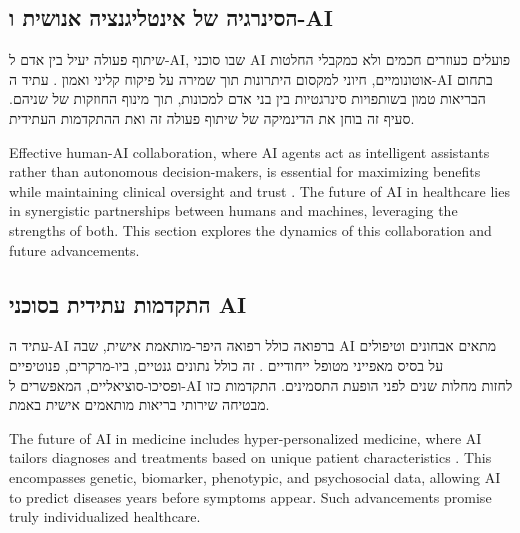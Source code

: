 \documentclass[12pt,a4paper]{article}
\newenvironment{hebrewblock}{%
  \begin{tcolorbox}[enhanced,breakable,title={\hebrewfont עברית},
    colback=blue!3!white,colframe=blue!35!white,fonttitle=\bfseries,
    attach boxed title to top right={yshift=-2.5mm,xshift=-4mm},
    boxed title style={colback=blue!35!white,sharp corners}]
  \begin{hebrew}
}{%
  \end{hebrew}\end{tcolorbox}\medskip
}
\newenvironment{englishblock}{%
  \begin{tcolorbox}[enhanced,breakable,title={English Translation},
    colback=gray!4!white,colframe=gray!40!white,fonttitle=\bfseries]
}{%
  \end{tcolorbox}\medskip
}
\begin{document}
\subsection{\texthebrew{הסינרגיה של אינטליגנציה אנושית ו-AI}}
\begin{hebrewblock}
שיתוף פעולה יעיל בין אדם ל-AI, שבו סוכני AI פועלים כעוזרים חכמים ולא כמקבלי החלטות אוטונומיים, חיוני למקסום היתרונות תוך שמירה על פיקוח קליני ואמון \cite{hitrustalliance.net}. עתיד ה-AI בתחום הבריאות טמון בשותפויות סינרגטיות בין בני אדם למכונות, תוך מינוף החוזקות של שניהם. סעיף זה בוחן את הדינמיקה של שיתוף פעולה זה ואת ההתקדמות העתידית.
\end{hebrewblock}
\begin{englishblock}
Effective human-AI collaboration, where AI agents act as intelligent assistants rather than autonomous decision-makers, is essential for maximizing benefits while maintaining clinical oversight and trust \cite{hitrustalliance.net}. The future of AI in healthcare lies in synergistic partnerships between humans and machines, leveraging the strengths of both. This section explores the dynamics of this collaboration and future advancements.
\end{englishblock}

\subsection{\texthebrew{התקדמות עתידית בסוכני AI}}
\begin{hebrewblock}
עתיד ה-AI ברפואה כולל רפואה היפר-מותאמת אישית, שבה AI מתאים אבחונים וטיפולים על בסיס מאפייני מטופל ייחודיים \cite{medicalfuturist.com}. זה כולל נתונים גנטיים, ביו-מרקרים, פנוטיפיים ופסיכו-סוציאליים, המאפשרים ל-AI לחזות מחלות שנים לפני הופעת התסמינים. התקדמות כזו מבטיחה שירותי בריאות מותאמים אישית באמת.
\end{hebrewblock}
\begin{englishblock}
The future of AI in medicine includes hyper-personalized medicine, where AI tailors diagnoses and treatments based on unique patient characteristics \cite{medicalfuturist.com}. This encompasses genetic, biomarker, phenotypic, and psychosocial data, allowing AI to predict diseases years before symptoms appear. Such advancements promise truly individualized healthcare.
\end{englishblock}
\end{document}
